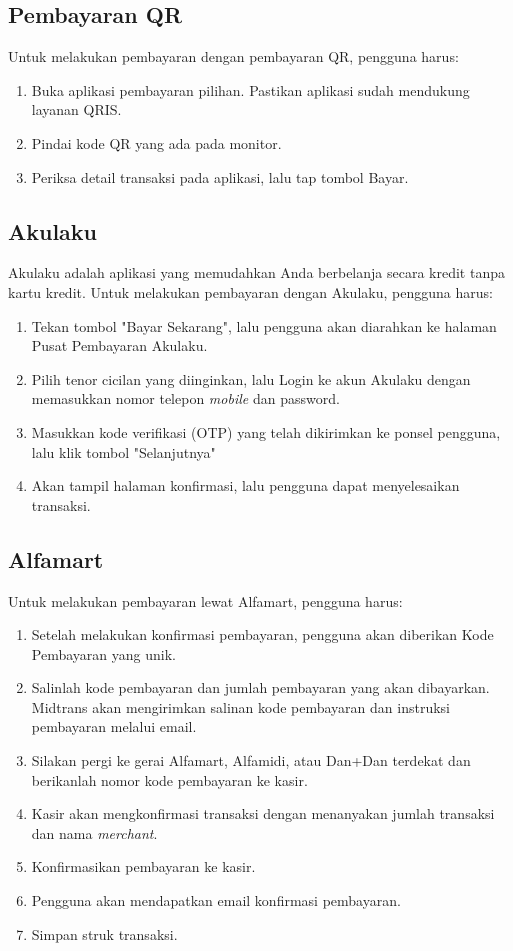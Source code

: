 \subsection{Pembayaran QR}
\label{subsec:pembayaranqr}
Untuk melakukan pembayaran dengan pembayaran QR, pengguna harus:

\begin{enumerate}
    \item Buka aplikasi pembayaran pilihan. Pastikan aplikasi sudah mendukung layanan QRIS.
    \item Pindai kode QR yang ada pada monitor.
    \item Periksa detail transaksi pada aplikasi, lalu tap tombol Bayar.
\end{enumerate}

\subsection{Akulaku}
\label{subsec:akulaku}
Akulaku adalah aplikasi yang memudahkan Anda berbelanja secara kredit tanpa kartu kredit. Untuk melakukan pembayaran dengan Akulaku, pengguna harus:

\begin{enumerate}
    \item Tekan tombol "Bayar Sekarang", lalu pengguna akan diarahkan ke halaman Pusat Pembayaran Akulaku.
    \item Pilih tenor cicilan yang diinginkan, lalu Login ke akun Akulaku dengan memasukkan nomor telepon \textit{mobile} dan password.
    \item Masukkan kode verifikasi (OTP) yang telah dikirimkan ke ponsel pengguna, lalu klik tombol "Selanjutnya"
    \item Akan tampil halaman konfirmasi, lalu pengguna dapat menyelesaikan transaksi.
\end{enumerate}

\subsection{Alfamart}
\label{subsec:alfamart}
Untuk melakukan pembayaran lewat Alfamart, pengguna harus:

\begin{enumerate}
    \item Setelah melakukan konfirmasi pembayaran, pengguna akan diberikan Kode Pembayaran yang unik.
    \item Salinlah kode pembayaran dan jumlah pembayaran yang akan dibayarkan. Midtrans akan mengirimkan salinan kode pembayaran dan instruksi pembayaran melalui email.
    \item Silakan pergi ke gerai Alfamart, Alfamidi, atau Dan+Dan terdekat dan berikanlah nomor kode pembayaran ke kasir.
    \item Kasir akan mengkonfirmasi transaksi dengan menanyakan jumlah transaksi dan nama \textit{merchant}.
    \item Konfirmasikan pembayaran ke kasir.
    \item Pengguna akan mendapatkan email konfirmasi pembayaran.
    \item Simpan struk transaksi.
\end{enumerate}

